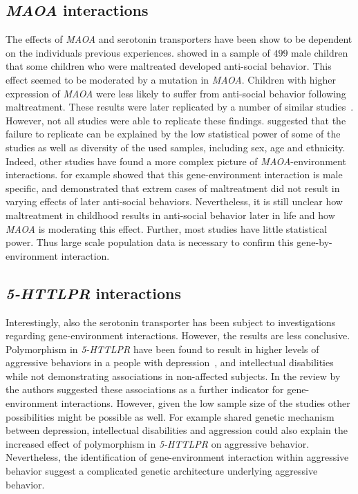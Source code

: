 \subsection{\textit{MAOA} interactions}
\label{sub:maoa_interactions}

The effects of \textit{MAOA} and serotonin transporters have been show to be dependent on the individuals previous experiences.
\citet{Caspi2002} showed in a sample of $499$ male children that some children who were maltreated developed anti-social behavior.
This effect seemed to be moderated by a mutation in \textit{MAOA}.
Children with higher expression of \textit{MAOA} were less likely to suffer from anti-social behavior following maltreatment.
These results were later replicated by a number of similar studies~\cite{KimCohen2006}.
However, not all studies were able to replicate these findings.
\citet{Anholt2012} suggested that the failure to replicate can be explained by the low statistical power of some of the studies as well as diversity of the used samples, including sex, age and ethnicity.
Indeed, other studies have found a more complex picture of \textit{MAOA}-environment interactions.
\citet{Huang2004} for example showed that this gene-environment interaction is male specific, and \citet{Weder2009} demonstrated that extrem cases of maltreatment did not result in varying effects of later anti-social behaviors.
Nevertheless, it is still unclear how maltreatment in childhood results in anti-social behavior later in life and how \textit{MAOA} is moderating this effect.
Further, most studies have little statistical power.
Thus large scale population data is necessary to confirm this gene-by-environment interaction.

\subsection{\textit{5-HTTLPR} interactions}
\label{sub:httlpr_interactions}
Interestingly, also the serotonin transporter has been subject to investigations regarding gene-environment interactions.
However, the results are less conclusive.
Polymorphism in \textit{5-HTTLPR} have been found to result in higher levels of aggressive behaviors in a people with depression~\cite{Gonda2011}, and intellectual disabilities~\cite{May2010} while not demonstrating associations in non-affected subjects.
In the review by~\citet{Anholt2012} the authors suggested these associations as a further indicator for gene-environment interactions.
However, given the low sample size of the studies other possibilities might be possible as well.
For example shared genetic mechanism between depression, intellectual disabilities and aggression could also explain the increased effect of polymorphism in \textit{5-HTTLPR} on aggressive behavior. 
Nevertheless, the identification of gene-environment interaction within aggressive behavior suggest a complicated genetic architecture underlying aggressive behavior.
\bigskip

